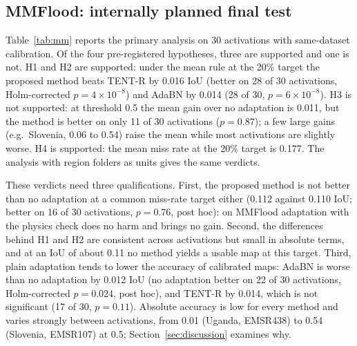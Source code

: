 \documentclass[a4paper,fleqn]{cas-sc}
\begin{document}
\subsection{MMFlood: internally planned final test}
\label{sec:mm}
Table~\ref{tab:mm} reports the primary analysis on 30 activations with same-dataset calibration. Of the four pre-registered hypotheses, three are supported and one is not. H1 and H2 are supported: under the mean rule at the 20\% target the proposed method beats TENT-R by 0.016 IoU (better on 28 of 30 activations, Holm-corrected $p=4\times10^{-8}$) and AdaBN by 0.014 (28 of 30, $p=6\times10^{-8}$). H3 is not supported: at threshold 0.5 the mean gain over no adaptation is 0.011, but the method is better on only 11 of 30 activations ($p=0.87$); a few large gains (e.g.\ Slovenia, 0.06 to 0.54) raise the mean while most activations are slightly worse. H4 is supported: the mean miss rate at the 20\% target is 0.177. The analysis with region folders as units gives the same verdicts.

These verdicts need three qualifications. First, the proposed method is not better than no adaptation at a common miss-rate target either (0.112 against 0.110 IoU; better on 16 of 30 activations, $p=0.76$, post hoc): on MMFlood adaptation with the physics check does no harm and brings no gain. Second, the differences behind H1 and H2 are consistent across activations but small in absolute terms, and at an IoU of about 0.11 no method yields a usable map at this target. Third, plain adaptation tends to lower the accuracy of calibrated maps: AdaBN is worse than no adaptation by 0.012 IoU (no adaptation better on 22 of 30 activations, Holm-corrected $p=0.024$, post hoc), and TENT-R by 0.014, which is not significant (17 of 30, $p=0.11$). Absolute accuracy is low for every method and varies strongly between activations, from 0.01 (Uganda, EMSR438) to 0.54 (Slovenia, EMSR107) at 0.5; Section~\ref{sec:discussion} examines why.

\begin{table}[t]
\caption{MMFlood, internally planned test, 30 activations (U-Net, three models), same-dataset calibration: mean IoU at threshold 0.5, under the mean rule and under the per-flood rule, with the number of activations that meet the 20\% target under the per-flood rule. Under the mean rule at the 20\% target the realised mean miss rate is 0.172--0.177 for every method.}
\label{tab:mm}
\centering
\small

\end{table}
\end{document}
